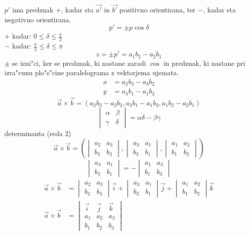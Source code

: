 $p'$ ima predznak $+$, kadar sta $\vec{a'}$ in $\vec{b'}$ pozitivno orientirana, ter $-$, kadar sta negativno orientirana.
%
$$p' = \pm p \cos \delta$$
$+$ kadar: $0 \leq \delta \leq \frac{\pi}{2}$\\
$-$ kadar: $\frac{\pi}{2} \leq \delta \leq \pi$
%
$$z = \pm p' = a_1b_2 - a_2b_1$$
$\pm$ se izni"ci, ker se predznak, ki nastane zaradi $\cos$ in predznak, ki nastane pri izra"cunu plo"s"cine paralelograma z vektorjema ujemata.
%
\begin{align*}
	x &= a_2b_3 - a_3b_2\\
	y &= a_3b_1 - a_1b_3
\end{align*}
%
$$\vec{a} \times \vec{b} = (a_2b_3 - a_3b_2, a_3b_1 - a_1b_3, a_1b_2 - a_2b_1)$$
%
\[
\begin{vmatrix}
\alpha & \beta\\
\gamma & \delta
\end{vmatrix}
= \alpha \delta - \beta \gamma
\]
determinanta (reda 2)
%
\[
\vec{a} \times \vec{b} = \left(
\begin{vmatrix}
a_2 & a_3\\
b_2 & b_3
\end{vmatrix}
,
\begin{vmatrix}
a_3 & a_1\\
b_3 & b_1
\end{vmatrix}
,
\begin{vmatrix}
a_1 & a_2 \\
b_1 & b_2
\end{vmatrix}
\right)
\]
%
\[
\begin{vmatrix}
a_3 & a_1\\
b_3 & b_1
\end{vmatrix}
= -
\begin{vmatrix}
a_1 & a_3 \\
b_1 & b_3
\end{vmatrix}
\]
%
\begin{align*}
	\vec{a} \times \vec{b} &= 
	\begin{vmatrix}
	a_2 & a_3\\
	b_2 & b_3
	\end{vmatrix}
	\vec{i} +
	\begin{vmatrix}
	a_3 & a_1 \\
	b_3 & b_1
	\end{vmatrix}
	\vec{j} +
	\begin{vmatrix}
	a_1 & a_2 \\
	b_1 & b_2
	\end{vmatrix}
	\vec{k}\\
	\vec{a} \times \vec{b} &=
	\begin{vmatrix}
	\vec{i} & \vec{j} & \vec{k}\\
	a_1 & a_2 & a_3 \\
	b_1 & b_2 & b_3
	\end{vmatrix}
\end{align*}
